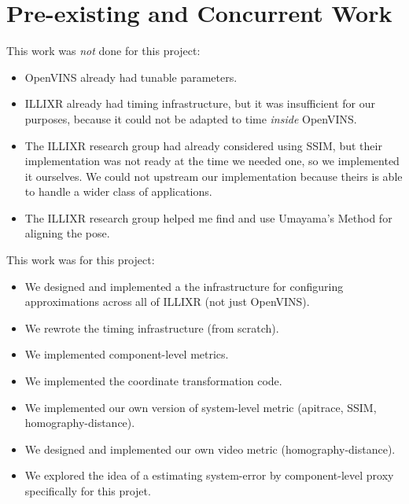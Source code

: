 \documentclass[sigconf,screen]{acmart}
\begin{document}



\appendix
\section{Pre-existing and Concurrent Work}
This work was \textit{not} done for this project:

\begin{itemize}
\item OpenVINS already had tunable parameters.
\item ILLIXR already had timing infrastructure, but it was insufficient for our purposes, because it could not be adapted to time \textit{inside} OpenVINS.
\item The ILLIXR research group had already considered using SSIM, but their implementation was not ready at the time we needed one, so we implemented it ourselves. We could not upstream our implementation because theirs is able to handle a wider class of applications.
\item The ILLIXR research group helped me find and use Umayama's Method for aligning the pose.
\end{itemize}

This work was for this project:

\begin{itemize}
\item We designed and implemented a the infrastructure for configuring approximations across all of ILLIXR (not just OpenVINS).
\item We rewrote the timing infrastructure (from scratch).
\item We implemented component-level metrics.
\item We implemented the coordinate transformation code.
\item We implemented our own version of system-level metric (apitrace, SSIM, homography-distance).
\item We designed and implemented our own video metric (homography-distance).
\item We explored the idea of a estimating system-error by component-level proxy specifically for this projet.
\end{itemize}
\end{document}
